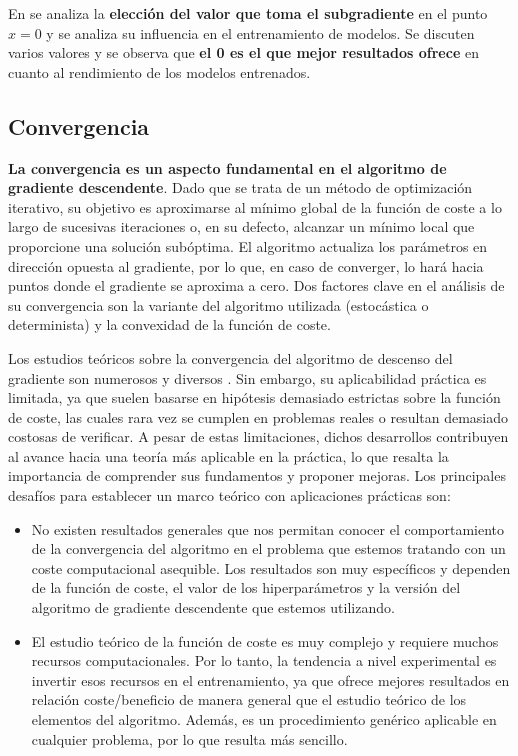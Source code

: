 En \cite{ReLuat0} se analiza la \textbf{elección del valor que toma el subgradiente} en el punto $x=0$ y se analiza su influencia en el entrenamiento de modelos. Se discuten varios valores y se observa que \textbf{el 0 es el que mejor resultados ofrece} en cuanto al rendimiento de los modelos entrenados.




\subsection{Convergencia} \label{sec:convergencia}

\textbf{La convergencia es un aspecto fundamental en el algoritmo de gradiente descendente}. Dado que se trata de un método de optimización iterativo, su objetivo es aproximarse al mínimo global de la función de coste a lo largo de sucesivas iteraciones o, en su defecto, alcanzar un mínimo local que proporcione una solución subóptima. El algoritmo actualiza los parámetros en dirección opuesta al gradiente, por lo que, en caso de converger, lo hará hacia puntos donde el gradiente se aproxima a cero. Dos factores clave en el análisis de su convergencia son la variante del algoritmo utilizada (estocástica o determinista) y la convexidad de la función de coste.


Los estudios teóricos sobre la convergencia del algoritmo de descenso del gradiente son numerosos y diversos \cite{optimal_gd, de2015global, mertikopoulos2020almost, fehrman2020convergence, tibshirani2013convex}. Sin embargo, su aplicabilidad práctica es limitada, ya que suelen basarse en hipótesis demasiado estrictas sobre la función de coste, las cuales rara vez se cumplen en problemas reales o resultan demasiado costosas de verificar. A pesar de estas limitaciones, dichos desarrollos contribuyen al avance hacia una teoría más aplicable en la práctica, lo que resalta la importancia de comprender sus fundamentos y proponer mejoras. Los principales desafíos para establecer un marco teórico con aplicaciones prácticas son:

\begin{itemize}

    \item No existen resultados generales que nos permitan conocer el comportamiento de la convergencia del algoritmo en el problema que estemos tratando con un coste computacional asequible. Los resultados son muy específicos y dependen de la función de coste, el valor de los hiperparámetros y la versión del algoritmo de gradiente descendente que estemos utilizando.

    \item El estudio teórico de la función de coste es muy complejo y requiere muchos recursos computacionales. Por lo tanto, la tendencia a nivel experimental es invertir esos recursos en el entrenamiento, ya que ofrece mejores resultados en relación coste/beneficio de manera general que el estudio teórico de los elementos del algoritmo. Además, es un procedimiento genérico aplicable en cualquier problema, por lo que resulta más sencillo.

   
\end{itemize}



